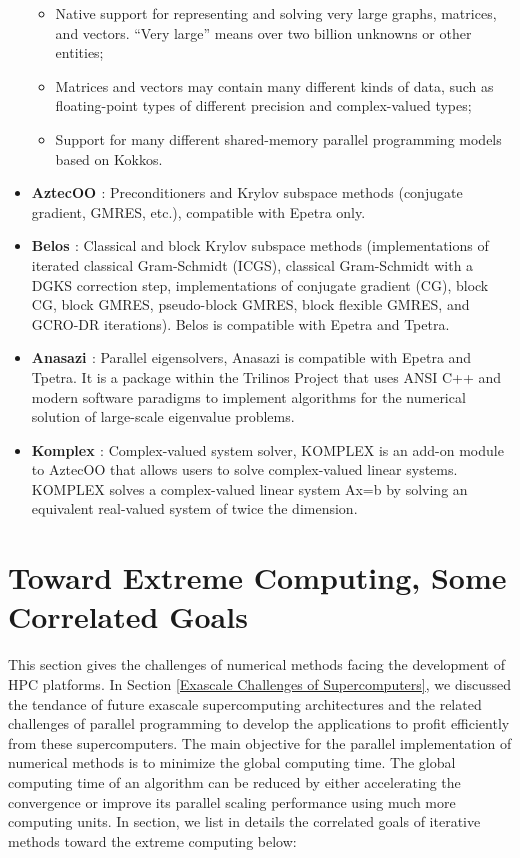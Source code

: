 \begin{itemize}
	\begin{itemize}
		\item Native support for representing and solving very large graphs, matrices, and vectors.  “Very large” means over two billion unknowns or other entities;
		\item Matrices and vectors may contain many different kinds of data, such as floating-point types of different precision and complex-valued types;
		\item Support for many different shared-memory parallel programming models based on Kokkos.
	\end{itemize}
	
	\item \textbf{AztecOO \cite{heroux2004aztecoo}}: Preconditioners and Krylov subspace methods (conjugate gradient, GMRES, etc.), compatible with Epetra only.
	\item \textbf{Belos \cite{bavier2012amesos2}}: Classical and block Krylov subspace methods (implementations of iterated classical Gram-Schmidt (ICGS), classical Gram-Schmidt with a DGKS correction step, implementations of conjugate gradient (CG), block CG, block GMRES, pseudo-block GMRES, block flexible GMRES, and GCRO-DR iterations). Belos is compatible with Epetra and Tpetra.
	\item \textbf{Anasazi \cite{baker2009anasazi}}: Parallel eigensolvers, Anasazi is compatible with Epetra and Tpetra. It is a package within the Trilinos Project that uses ANSI C++ and modern software paradigms to implement algorithms for the numerical solution of large-scale eigenvalue problems.
	\item \textbf{Komplex \cite{day2001solving}}: Complex-valued system solver, KOMPLEX is an add-on module to AztecOO that allows users to solve complex-valued linear systems. KOMPLEX solves a complex-valued linear system Ax=b by solving an equivalent real-valued system of twice the dimension.
\end{itemize}

\section{Toward Extreme Computing, Some Correlated Goals}\label{Toward Extreme Computing, Some Correlated Goals}

This section gives the challenges of numerical methods facing the development of HPC platforms. In Section \ref{Exascale Challenges of Supercomputers}, we discussed the tendance of future exascale supercomputing architectures and the related challenges of parallel programming to develop the applications to profit efficiently from these supercomputers. The main objective for the parallel implementation of numerical methods is to minimize the global computing time. The global computing time of an algorithm can be reduced by either accelerating the convergence or improve its parallel scaling performance using much more computing units. In section, we list in details the correlated goals of iterative methods toward the extreme computing below:

